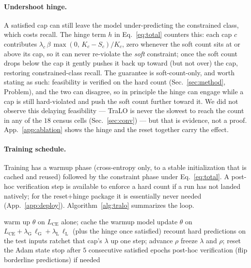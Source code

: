 \documentclass[10pt]{article}
\begin{document}
\paragraph{Undershoot hinge.}
A satisfied cap can still leave the model under-predicting the constrained
class, which costs recall. The hinge term $h$ in Eq.~\eqref{eq:total}
counters this: each cap $c$ contributes
$\lambda_c\,\beta\,\max(0,\,K_c-S_c)/K_c$, zero whenever the soft count sits
at or above its cap, so it can never re-violate
{\color{blue}the \emph{soft} constraint}; once the soft count drops
below the cap it gently pushes it back up toward (but not over) the cap,
restoring constrained-class recall.
{\color{blue}The guarantee is soft-count-only, and worth stating as such:
feasibility is verified on the hard count (Sec.~\ref{sec:method}, Problem), and
the two can disagree, so in principle the hinge can engage while a cap is still
hard-violated and push the soft count further toward it. We did not observe this
delaying feasibility --- TraLO is never the slowest to reach the count in any of
the $18$ census cells (Sec.~\ref{sec:conv}) --- but that is evidence, not a
proof.} App.~\ref{app:ablation} shows the hinge
and the reset together carry the effect.

\paragraph{Training schedule.}
Training has a warmup phase (cross-entropy only, to a stable initialization
that is cached and reused) followed by the constraint phase under
Eq.~\eqref{eq:total}. A post-hoc verification step is available to enforce a
hard count if a run has not landed natively; for the reset+hinge package it
is essentially never needed (App.~\ref{app:deploy}). Algorithm~\ref{alg:tralo}
summarizes the loop.

\begin{algorithm}[t]
\caption{The training loop of the package studied here.}
\label{alg:tralo}
\begin{algorithmic}[1]
\State warm up $\theta$ on $L_{\text{CE}}$ alone; cache the warmup model
  \State update $\theta$ on $L_{\text{CE}} + \lambda_{\mathrm{G}}\,\ell_{\mathrm{G}} + \lambda_{\mathrm{L}}\,\ell_{\mathrm{L}}$ (plus the hinge once satisfied)
  \State recount hard predictions on the test inputs
    \State ratchet that cap's $\lambda$ up one step; advance $\rho$
    \State freeze $\lambda$ and $\rho$; reset the Adam state
  \EndIf
  \State stop after $5$ consecutive satisfied epochs
\EndFor
\State post-hoc verification (flip borderline predictions) if needed
\end{algorithmic}
\end{algorithm}
\end{document}
